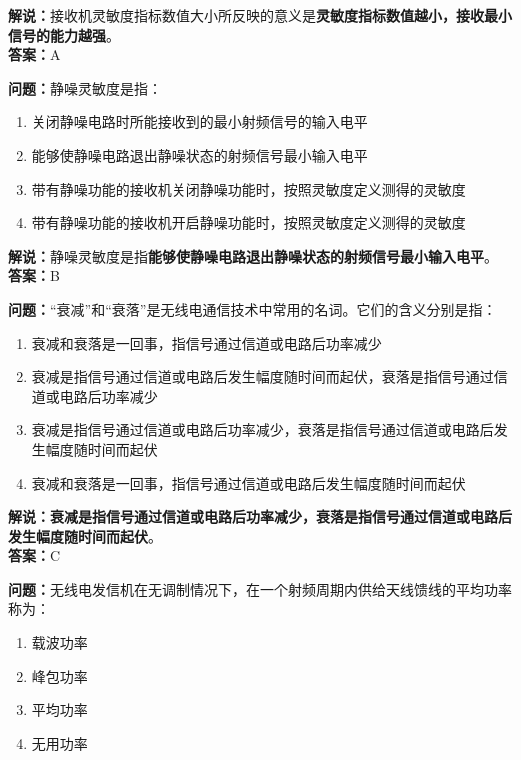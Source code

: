 \documentclass{ctexbook}
\begin{document}
\noindent\textbf{解说：}接收机灵敏度指标数值大小所反映的意义是\textbf{灵敏度指标数值越小，接收最小信号的能力越强}。\\\noindent\textbf{答案：}A%


\bigskip


\noindent\textbf{问题：}静噪灵敏度是指：

\begin{enumerate}[label=\Alph*), leftmargin=3em]
	\item 关闭静噪电路时所能接收到的最小射频信号的输入电平
	\item 能够使静噪电路退出静噪状态的射频信号最小输入电平
	\item 带有静噪功能的接收机关闭静噪功能时，按照灵敏度定义测得的灵敏度
	\item 带有静噪功能的接收机开启静噪功能时，按照灵敏度定义测得的灵敏度
\end{enumerate}

\noindent\textbf{解说：}静噪灵敏度是指\textbf{能够使静噪电路退出静噪状态的射频信号最小输入电平}。\\\noindent\textbf{答案：}B%


\bigskip


\noindent\textbf{问题：}“衰减”和“衰落”是无线电通信技术中常用的名词。它们的含义分别是指：

\begin{enumerate}[label=\Alph*), leftmargin=3em]
	\item 衰减和衰落是一回事，指信号通过信道或电路后功率减少
	\item 衰减是指信号通过信道或电路后发生幅度随时间而起伏，衰落是指信号通过信道或电路后功率减少
	\item 衰减是指信号通过信道或电路后功率减少，衰落是指信号通过信道或电路后发生幅度随时间而起伏
	\item 衰减和衰落是一回事，指信号通过信道或电路后发生幅度随时间而起伏
\end{enumerate}

\noindent\textbf{解说：}\textbf{衰减是指信号通过信道或电路后功率减少，衰落是指信号通过信道或电路后发生幅度随时间而起伏}。\\\noindent\textbf{答案：}C%


\bigskip


\noindent\textbf{问题：}无线电发信机在无调制情况下，在一个射频周期内供给天线馈线的平均功率称为：

\begin{enumerate}[label=\Alph*), leftmargin=3em]
	\item 载波功率
	\item 峰包功率
	\item 平均功率
	\item 无用功率
\end{enumerate}
\end{document}
